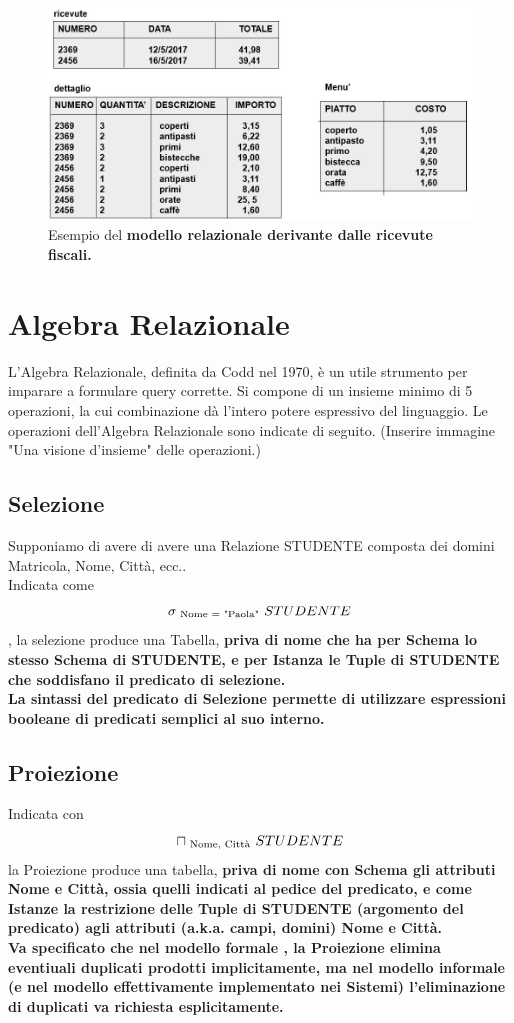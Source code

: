 \documentclass[11pt]{article} %
\begin{document}
\begin{figure}[htbp]
		\includegraphics{ModelloRelazionaleRicevuteFiscali.jpg}
	\caption{Esempio del \bf modello relazionale \rm derivante dalle ricevute fiscali.}
\end{figure}
\newpage
\section{Algebra Relazionale}
L'Algebra Relazionale, definita da Codd nel 1970, è un utile strumento per imparare a formulare query corrette. Si compone di un insieme minimo di 5 operazioni, la cui combinazione dà l'intero potere espressivo del linguaggio. Le operazioni dell'Algebra Relazionale sono indicate di seguito. (Inserire immagine "Una visione d'insieme" delle operazioni.)
\subsection{Selezione}
Supponiamo di avere di avere una Relazione STUDENTE composta dei domini Matricola, Nome, Città, ecc..\\
Indicata come $$ \sigma \textsubscript{ Nome = "Paola"}\  STUDENTE $$, la selezione produce una Tabella, \bf priva di nome \rm che ha per Schema lo stesso Schema di STUDENTE, e per Istanza le Tuple di STUDENTE che soddisfano il predicato di selezione.\\
La sintassi del predicato di Selezione permette di utilizzare espressioni booleane di predicati semplici al suo interno.
\subsection{Proiezione}
Indicata con $$ \sqcap \textsubscript{ Nome, Città}\  STUDENTE $$ la Proiezione produce una tabella, \bf priva di nome \rm con Schema gli attributi Nome e Città, ossia quelli indicati al pedice del predicato, e come Istanze la restrizione delle Tuple di STUDENTE (argomento del predicato) agli attributi (a.k.a. campi, domini) Nome e Città.\\
Va specificato che nel modello \bf formale \rm, la Proiezione elimina eventiuali duplicati prodotti implicitamente, ma nel modello \bf informale \rm (e nel modello effettivamente implementato nei Sistemi) l'eliminazione di duplicati va richiesta esplicitamente.
\end{document}
